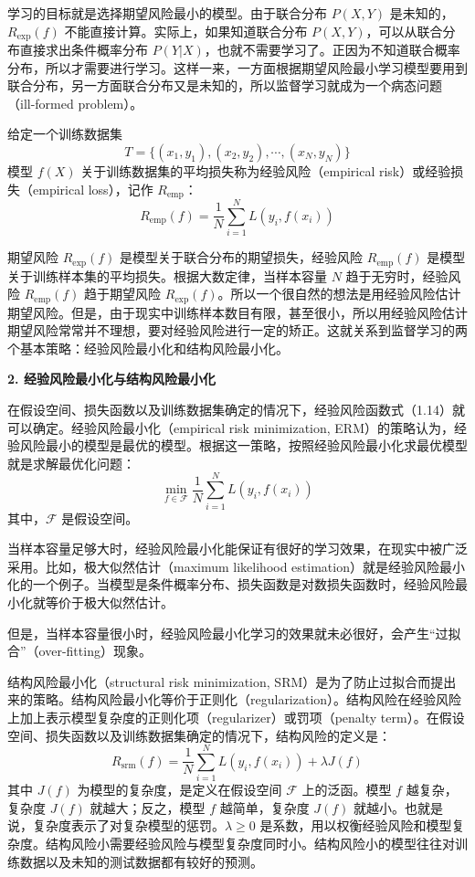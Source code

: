 \documentclass[UTF8, 12pt, fontset=fandol, oneside]{ctexart}
\begin{document}
学习的目标就是选择期望风险最小的模型。由于联合分布 $P(X,Y)$ 是未知的，$R_{\exp}(f)$ 不能直接计算。实际上，如果知道联合分布 $P(X,Y)$，可以从联合分布直接求出条件概率分布 $P(Y|X)$，也就不需要学习了。正因为不知道联合概率分布，所以才需要进行学习。这样一来，一方面根据期望风险最小学习模型要用到联合分布，另一方面联合分布又是未知的，所以监督学习就成为一个病态问题（ill-formed problem）。

给定一个训练数据集
\[
  T=\{(x_1,y_1),(x_2,y_2),\cdots,(x_N,y_N)\}
\]
模型 $f(X)$ 关于训练数据集的平均损失称为经验风险（empirical risk）或经验损失（empirical loss），记作 $R_{\mathrm{emp}}$：
\begin{equation}
  R_{\mathrm{emp}}(f)=\frac1N\sum_{i=1}^N L(y_i,f(x_i))
  \tag{1.14}
\end{equation}

期望风险 $R_{\exp}(f)$ 是模型关于联合分布的期望损失，经验风险 $R_{\mathrm{emp}}(f)$ 是模型关于训练样本集的平均损失。根据大数定律，当样本容量 $N$ 趋于无穷时，经验风险 $R_{\mathrm{emp}}(f)$ 趋于期望风险 $R_{\exp}(f)$。所以一个很自然的想法是用经验风险估计期望风险。但是，由于现实中训练样本数目有限，甚至很小，所以用经验风险估计期望风险常常并不理想，要对经验风险进行一定的矫正。这就关系到监督学习的两个基本策略：经验风险最小化和结构风险最小化。

\noindent\textbf{2. 经验风险最小化与结构风险最小化}

在假设空间、损失函数以及训练数据集确定的情况下，经验风险函数式（1.14）就可以确定。经验风险最小化（empirical risk minimization, ERM）的策略认为，经验风险最小的模型是最优的模型。根据这一策略，按照经验风险最小化求最优模型就是求解最优化问题：
\begin{equation}
  \min_{f\in\mathcal F}\frac1N\sum_{i=1}^N L(y_i,f(x_i))
  \tag{1.15}
\end{equation}
其中，$\mathcal F$ 是假设空间。

当样本容量足够大时，经验风险最小化能保证有很好的学习效果，在现实中被广泛采用。比如，极大似然估计（maximum likelihood estimation）就是经验风险最小化的一个例子。当模型是条件概率分布、损失函数是对数损失函数时，经验风险最小化就等价于极大似然估计。

但是，当样本容量很小时，经验风险最小化学习的效果就未必很好，会产生“过拟合”（over-fitting）现象。

结构风险最小化（structural risk minimization, SRM）是为了防止过拟合而提出来的策略。结构风险最小化等价于正则化（regularization）。结构风险在经验风险上加上表示模型复杂度的正则化项（regularizer）或罚项（penalty term）。在假设空间、损失函数以及训练数据集确定的情况下，结构风险的定义是：
\begin{equation}
  R_{\mathrm{srm}}(f)=\frac1N\sum_{i=1}^N L(y_i,f(x_i))+\lambda J(f)
  \tag{1.16}
\end{equation}
其中 $J(f)$ 为模型的复杂度，是定义在假设空间 $\mathcal F$ 上的泛函。模型 $f$ 越复杂，复杂度 $J(f)$ 就越大；反之，模型 $f$ 越简单，复杂度 $J(f)$ 就越小。也就是说，复杂度表示了对复杂模型的惩罚。$\lambda\ge0$ 是系数，用以权衡经验风险和模型复杂度。结构风险小需要经验风险与模型复杂度同时小。结构风险小的模型往往对训练数据以及未知的测试数据都有较好的预测。
\end{document}

